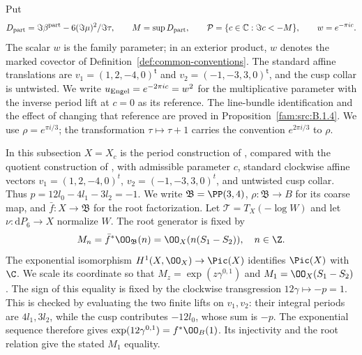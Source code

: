 \begin{definition}
\hypertarget{tag-PI01}{}\label{I:def:family-parameter}
Put
\begin{equation}
 D_{\rm part}=\Im\beta^{\rm part}
                  -6(\Im\mu)^2/\Im\tau,\qquad
 M=\sup D_{\rm part},\qquad
 \mathcal P=\{c\in\mathbb C:\Im c<-M\},\qquad w=e^{-\pi ic}.
\label{pub:I:eq:PD1}
\end{equation}
The scalar $w$ is the family parameter; in an exterior product,
$w$ denotes the marked covector of Definition~\ref{def:common-conventions}.
The standard affine translations are
$v_1=(1,2,-4,0)^{\mathsf t}$ and
$v_2=(-1,-3,3,0)^{\mathsf t}$, and the cusp collar is untwisted.
We write $u_{\rm Engel}=e^{-2\pi ic}=w^2$ for the multiplicative
parameter with the inverse period lift at $c=0$ as its reference.
The line-bundle identification and the effect of changing that reference
are proved in Proposition~\ref{fam:src:B.1.4}.
We use $\rho=e^{\pi i/3}$; the transformation $\tau\mapsto\tau+1$
carries the convention $e^{2\pi i/3}$ to $\rho$.
\end{definition}

In this subsection $X=X_c$ is the period construction of \cite{AC26}, compared with the quotient construction of \cite{Engel2026}, with admissible parameter $c$, standard clockwise affine vectors
$v_1=(1,2,-4,0)^t$, $v_2=(-1,-3,3,0)^t$, and untwisted cusp collar. Thus $p=12l_0-4l_1-3l_2=-1$. We write $\mathfrak B=\PP(3,4)$, $\rho:\mathfrak B\to B$ for its coarse map, and $\bar f:X\to\mathfrak B$ for the root factorization. Let $\mathcal T=T_X(-\log W)$ and let $\nu:\mathrm dP_6\to X$ normalize $W$. The root generator is fixed by
\[
 M_n=\bar f^*\OO_{\mathfrak B}(n)
     =\OO_X(n(S_1-S_2)),\quad n\in\Z.
\]
The exponential isomorphism $H^1(X,\OO_X)\to\Pic(X)$ identifies $\Pic(X)$ with $\C$. We scale its coordinate so that $M_z=\exp(z\gamma^{0,1})$ and $M_1=\OO_X(S_1-S_2)$. The sign of this equality is fixed by the clockwise transgression $12\gamma\mapsto-p=1$. This is checked by evaluating the two finite lifts on $v_1,v_2$: their integral periods are $4l_1,3l_2$, while the cusp contributes $-12l_0$, whose sum is $-p$. The exponential sequence therefore gives $\exp(12\gamma^{0,1})=f^*\OO_B(1)$. Its injectivity and the root relation give the stated $M_1$ equality.
